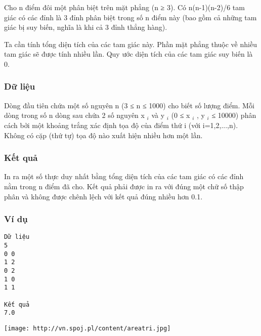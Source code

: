 



   Cho n điểm đôi một phân biệt trên mặt phẳng (n ≥ 3). Có n(n-1)(n-2)/6 tam giác có các đỉnh là 3 đỉnh phân biệt trong số n điểm này (bao gồm cả những tam giác bị suy biến, nghĩa là khi cả 3 đỉnh thẳng hàng).  

   Ta cần tính tổng diện tích của các tam giác này. Phần mặt phẳng thuộc về nhiều tam giác sẽ được tính nhiều lần. Quy ước diện tích của các tam giác suy biến là 0.  

\subsubsection{   Dữ liệu  }

   Dòng đầu tiên chứa một số nguyên n (3 ≤ n ≤ 1000) cho biết số lượng điểm. Mỗi dòng trong số n dòng sau chứa 2 số nguyên x   $_    i   $   và y   $_    i   $   (0 ≤ x   $_    i   $   , y   $_    i   $   ≤ 10000) phân cách bởi một khoảng trắng xác định tọa độ của điểm thứ i (với i=1,2,...,n). Không có cặp (thứ tự) tọa độ nào xuất hiện nhiều hơn một lần.  

\subsubsection{   Kết quả  }

   In ra một số thực duy nhất bằng tổng diện tích của các tam giác có các đỉnh nằm trong n điểm đã cho. Kết quả phải được in ra với đúng một chữ số thập phân và không được chênh lệch với kết quả đúng nhiều hơn 0.1.  

\subsubsection{   Ví dụ  }
\begin{verbatim}
Dữ liệu
5
0 0
1 2
0 2
1 0
1 1

Kết quả
7.0
\end{verbatim}
\texttt{[image: http://vn.spoj.pl/content/areatri.jpg]}
